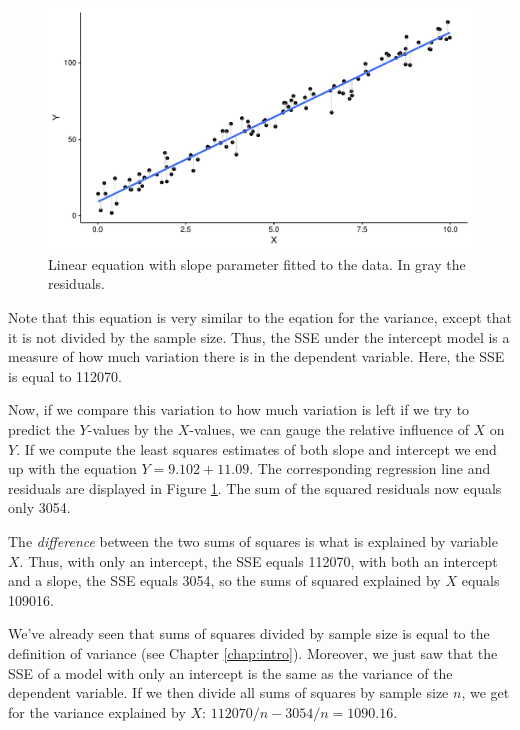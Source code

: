 \documentclass[]{book}\usepackage[]{graphicx}\usepackage[]{color}
\makeatletter
\def\maxwidth{ %
  \ifdim\Gin@nat@width>\linewidth
    \linewidth
  \else
    \Gin@nat@width
  \fi
}
\newenvironment{knitrout}{}{} %
\makeatother
\begin{document}
\begin{knitrout}
\color{fgcolor}\begin{figure}

{\centering \includegraphics[width=\maxwidth]{figure/intercept_plus_slope-1} 

}

\caption[Linear equation with slope parameter fitted to the data]{Linear equation with slope parameter fitted to the data. In gray the residuals. }\label{fig:intercept_plus_slope}
\end{figure}


\end{knitrout}


Note that this equation is very similar to the eqation for the variance, except that it is not divided by the sample size. Thus, the SSE under the intercept model is a measure of how much variation there is in the dependent variable. Here, the SSE is equal to 112070.

Now, if we compare this variation to how much variation is left if we try to predict the $Y$-values by the $X$-values, we can gauge the relative influence of $X$ on $Y$. If we compute the least squares estimates of both slope and intercept we end up with the equation $Y = 9.102 + 11.09 $. The corresponding regression line and residuals are displayed in Figure \ref{fig:intercept_plus_slope}. The sum of the squared residuals now equals only 3054. 

The \textit{difference} between the two sums of squares is what is explained by variable $X$. Thus, with only an intercept, the SSE equals 112070, with both an intercept and a slope, the SSE equals 3054, so the sums of squared explained by $X$ equals 109016. 

We've already seen that sums of squares divided by sample size is equal to the definition of variance (see Chapter \ref{chap:intro}). Moreover, we just saw that the SSE of a model with only an intercept is the same as the variance of the dependent variable. If we then divide all sums of squares by sample size $n$, we get for the variance explained by $X$: $112070/n - 3054/n = 1090.16$.
 
\end{document}
